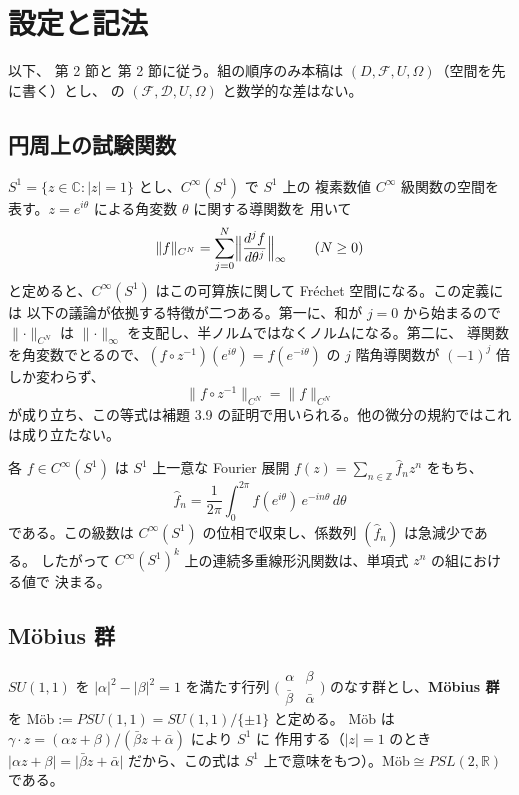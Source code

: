 \documentclass[11pt,a4paper]{article}
\newcommand{\Mob}{\mathrm{M\text{ö}b}}
\newcommand{\Circ}{S^{1}}
\newcommand{\Fields}{\mathcal{F}}
\newcommand{\Dom}{D}
\newcommand{\CN}[1]{\lVert #1 \rVert_{C^{N}}}
\newcommand{\norm}[1]{\lVert #1 \rVert}
\newcommand{\abs}[1]{\lvert #1 \rvert}
\theoremstyle{definition}
\begin{document}
\section{設定と記法}
\label{sec:setting}

以下、\cite{T26} 第 2 節と \cite{CRTT25} 第 2 節に従う。組の順序のみ本稿は
$(\Dom, \Fields, U, \Omega)$（空間を先に書く）とし、\cite{T26} の
$(\Fields, \mathcal{D}, U, \Omega)$ と数学的な差はない。

\subsection{円周上の試験関数}

$\Circ = \{z \in \mathbb{C} : \abs{z} = 1\}$ とし、$C^\infty(\Circ)$ で $\Circ$ 上の
複素数値 $C^\infty$ 級関数の空間を表す。$z = e^{i\theta}$ による角変数 $\theta$ に関する導関数を
用いて
\[
  \CN{f} = \sum_{j=0}^{N} \Bigl\lVert \frac{d^{j} f}{d\theta^{j}} \Bigr\rVert_{\infty}
  \qquad (N \ge 0)
\]
と定めると、$C^\infty(\Circ)$ はこの可算族に関して Fr\'echet 空間になる。この定義には
以下の議論が依拠する特徴が二つある。第一に、和が $j = 0$ から始まるので
$\CN{\cdot}$ は $\norm{\cdot}_\infty$ を支配し、半ノルムではなくノルムになる。第二に、
導関数を角変数でとるので、$(f \circ z^{-1})(e^{i\theta}) = f(e^{-i\theta})$ の
$j$ 階角導関数が $(-1)^j$ 倍しか変わらず、
\begin{equation}
  \label{eq:cnorm-inv}
  \CN{f \circ z^{-1}} = \CN{f}
\end{equation}
が成り立ち、この等式は補題 3.9 の証明で用いられる。他の微分の規約ではこれは成り立たない。

各 $f \in C^\infty(\Circ)$ は $\Circ$ 上一意な Fourier 展開
$f(z) = \sum_{n \in \mathbb{Z}} \hat{f}_n z^n$ をもち、
\[
  \hat{f}_n = \frac{1}{2\pi}\int_0^{2\pi} f(e^{i\theta})\, e^{-in\theta}\, d\theta
\]
である。この級数は $C^\infty(\Circ)$ の位相で収束し、係数列 $(\hat{f}_n)$ は急減少である。
したがって $C^\infty(\Circ)^k$ 上の連続多重線形汎関数は、単項式 $z^n$ の組における値で
決まる。

\subsection{M\"obius 群}

$SU(1,1)$ を $\lvert\alpha\rvert^2 - \lvert\beta\rvert^2 = 1$ を満たす行列
$\bigl(\begin{smallmatrix}\alpha & \beta \\ \bar\beta & \bar\alpha\end{smallmatrix}\bigr)$
のなす群とし、\textbf{M\"obius 群}を $\Mob := PSU(1,1) = SU(1,1)/\{\pm 1\}$ と定める。
$\Mob$ は $\gamma \cdot z = (\alpha z + \beta)/(\bar\beta z + \bar\alpha)$ により $\Circ$ に
作用する（$\abs{z} = 1$ のとき $\abs{\alpha z + \beta} = \lvert\bar\beta z + \bar\alpha\rvert$
だから、この式は $\Circ$ 上で意味をもつ）。$\Mob \cong PSL(2,\mathbb{R})$ である。
\end{document}
